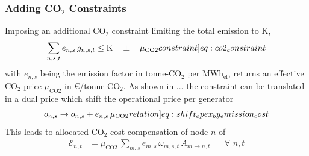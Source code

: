 \documentclass[11pt]{article}
\newcommand{\generation}[1][n]{g_{#1,s,t}}
\newcommand{\generationshare}[1][n]{\omega_{#1,s,t}}
\newcommand{\capacityGeneration}{G_{n,s}}
\newcommand{\capexGeneration}{c_{n,s}}
\newcommand{\opexGeneration}[1][n]{o_{#1,s}}
\newcommand{\demand}[1][n]{d_{#1,a,t}}
\newcommand{\lmp}[1][n]{\lambda_{#1,t}}
\newcommand{\injection}{p_{n,t}}
\newcommand{\netconsumption}{p^{-}_{n,t}}
\newcommand{\netproduction}{p^{+}_{n,t}}
\newcommand{\selfconsumption}{p^{\circ}_{n,t}}
\newcommand{\allocatePeer}[1][m \rightarrow n]{A_{#1,t}}
\newcommand{\allocateEmissionCost}[1][n]{\mathcal{E}_{#1,t}}
\newcommand{\emission}[1][n]{e_{#1,s}}
\newcommand{\emissionPrice}{\mu_{\text{CO2}}}
\newcommand{\megawatthour}{MWh$_\text{el}$}
\newcommand{\resultsin}[1]{\hspace{12pt} \bot  \hspace{12pt} #1}
\newcommand{\Forall}[1]{\hspace{20pt} \forall \,\, #1 }
\begin{document}
\subsubsection*{Adding CO$_2$ Constraints}

Imposing an additional CO$_2$ constraint limiting the total emission to K,  
\begin{align}
 \sum_{n,s,t} \emission \, \generation \le \text{K} \resultsin{\emissionPrice} 
 \label[constraint]{eq:co2_constraint}
\end{align}
with $\emission$ being the emission factor in tonne-CO$_2$ per \megawatthour, returns an effective CO$_2$ price $\emissionPrice$ in \euro/tonne-CO$_2$. 
% 
As shown in ... the constraint can be translated in a dual price which shift the operational price per generator
\begin{align}
\opexGeneration \rightarrow \opexGeneration + \emission \, \emissionPrice \label[relation]{eq:shift_opex_by_emission_cost}
\end{align}
This leads to allocated CO$_2$ cost compensation of node $n$ of
 \begin{align}
 \allocateEmissionCost &= \emissionPrice \, \sum_{m,s} \emission[m] \, \generationshare[m] \, \allocatePeer \Forall{n,t} \label{eq:allocate_emissionPrice}
\end{align}





% 
\end{document}

